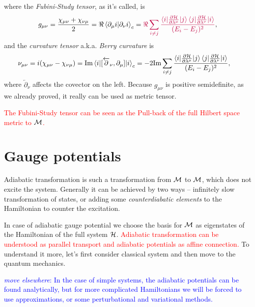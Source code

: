 where the \emph{Fubini-Study tensor}, as it's called, is
\begin{equation}
    g_{\mu\nu} = \frac{\chi_{\mu\nu}+\chi_{\nu\mu}}{2} = \Re\braket{\partial_\mu i|\partial_\nu i}_c = \textcolor{purple}{\Re \sum_{i\neq j}\frac{\braket{i|\frac{\partial \mathcal{H}}{\partial \lambda^\mu}|j}\braket{j|\frac{\partial \mathcal{H}}{\partial \lambda^\nu}|i}}{(E_i-E_j)^2}},
    \label{eq:geom.tensorREdefinition}
\end{equation}
and the \emph{curvature tensor} a.k.a. \emph{Berry curvature} is
\begin{equation}
    \begin{split}
        \nu_{\mu\nu} = i(\chi_{\mu\nu}-\chi_{\nu\mu})&= \textrm{Im}\braket{i|[\overleftarrow{\partial}_\nu,\partial_\mu]|i}_c = -2 \textrm{Im} \sum_{i\neq j}\frac{\braket{i|\frac{\partial \mathcal{H}}{\partial \lambda^\mu}|j}\braket{j|\frac{\partial \mathcal{H}}{\partial \lambda^\nu}|i}}{(E_i-E_j)^2},
    \end{split}
\end{equation}
where $\overleftarrow{\partial}_\nu$ affects the covector on the left.
Because $g_{\mu\nu}$ is positive semidefinite, as we already proved, it really can be used as metric tensor.

\textcolor{red}{The Fubini-Study tensor can be seen as the Pull-back of the full Hilbert space metric to $\mathcal{M}$. }










\section{Gauge potentials}
Adiabatic transformation is such a transformation from $\mathcal{M}$ to $\mathcal{M}$, which does not excite the system. Generally it can be achieved by two ways -- infinitely slow transformation of states, or adding some \emph{counterdiabatic elements} to the Hamiltonian to counter the excitation.


In case of adiabatic gauge potential we choose the basis for $\mathcal{M}$ as eigenstates of the Hamiltonian of the full system $\mathcal{H}$. \textcolor{red}{Adiabatic transformation can be understood as parallel transport and adiabatic potentials as affine connection.} To understand it more, let's first consider classical system and then move to the quantum mechanics.


\textcolor{blue}{\emph{move elsewhere}: In the case of simple systems, the adiabatic potentials can be found analytically, but for more complicated Hamiltonians we will be forced to use approximations, or some perturbational and variational methods.}




